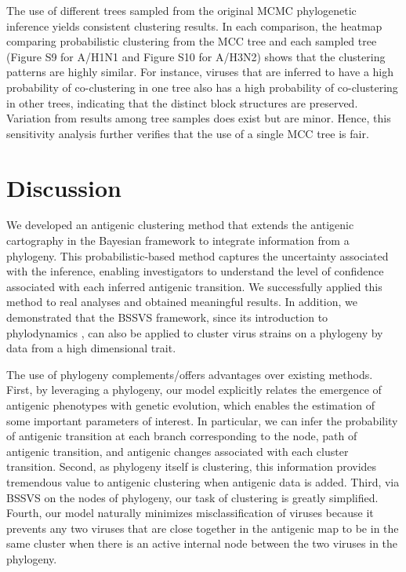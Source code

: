 \documentclass[11pt,oneside,letterpaper]{article}
\begin{document}
The use of different trees sampled from the original MCMC phylogenetic inference yields consistent clustering results. 
In each comparison, the heatmap comparing probabilistic clustering from the MCC tree and each sampled tree (Figure S9  for A/H1N1 and Figure S10 for A/H3N2) shows that the clustering patterns are highly similar. 
For instance, viruses that are inferred to have a high probability of co-clustering in one tree also has a high probability of co-clustering in other trees, indicating that the distinct block structures are preserved. 
Variation from results among tree samples does exist but are minor. 
Hence, this sensitivity analysis further verifies that the use of a single MCC tree is fair.



\newpage

\section*{Discussion}

We developed an antigenic clustering method that extends the antigenic cartography in the Bayesian framework to integrate information from a phylogeny. 
This probabilistic-based method captures the uncertainty associated with the inference, enabling investigators to understand the level of confidence associated with each inferred antigenic transition. 
We successfully applied this method to real analyses and obtained meaningful results.
In addition, we demonstrated that the BSSVS framework, since its introduction to phylodynamics \cite{lemey_bayesian_2009, drummond_bayesian_2010}, can also be applied to cluster virus strains on a phylogeny by data from a high dimensional trait.  

The use of phylogeny complements/offers advantages over existing methods. 
First, by leveraging a phylogeny, our model explicitly relates the emergence of antigenic phenotypes with genetic evolution, which enables the estimation of some important parameters of interest. 
In particular, we can infer the probability of antigenic transition at each branch corresponding to the node, path of antigenic transition, and antigenic changes associated with each cluster transition. 
Second, as phylogeny itself is clustering, this information provides tremendous value to antigenic clustering when antigenic data is added. 
Third, via BSSVS on the nodes of phylogeny, our task of clustering is greatly simplified. 
Fourth, our model naturally minimizes misclassification of viruses because it prevents any two viruses that are close together in the antigenic map to be in the same cluster when there is an active internal node between the two viruses in the phylogeny.
\end{document}
